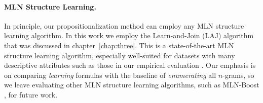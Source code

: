 	\paragraph{MLN Structure Learning.} In principle, our propositionalization method can employ any MLN structure learning algorithm. In this work we employ the Learn-and-Join (LAJ) algorithm that was discussed in chapter~\ref{chap:three}. This is a state-of-the-art MLN structure learning algorithm, especially well-suited for datasets with many descriptive attributes such as those in our empirical evaluation \cite{Khosravi2010,Schulte2012}. Our emphasis is on comparing {\em learning} formulas with the baseline of {\em enumerating} all $n$-grams, so we leave 
	evaluating other MLN structure learning algorithms, such as MLN-Boost \cite{Khot2011}, for future work. 	%
	
	
